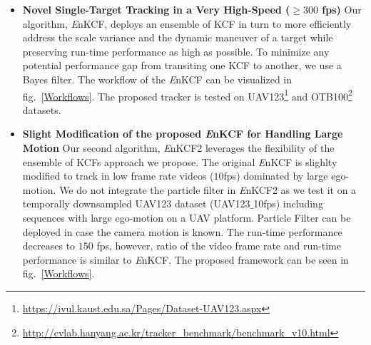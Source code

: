 \documentclass{bmvc2k}
\begin{document}
\begin{itemize}
\item \textbf{Novel Single-Target Tracking in a Very High-Speed ($\geq300$ fps) } Our
  algorithm, {\it E}nKCF, deploys an ensemble of KCF in turn to more
  efficiently address the scale variance and the dynamic maneuver of a
  target while preserving run-time performance as high as possible. To
  minimize any potential performance gap from transiting one KCF to
  another, we use a Bayes filter. The workflow of the  {\it E}nKCF can
  be visualized in fig.~\ref{Workflows}. The proposed tracker is tested on UAV123\footnote{\url{https://ivul.kaust.edu.sa/Pages/Dataset-UAV123.aspx}} and OTB100\footnote{\url{http://cvlab.hanyang.ac.kr/tracker_benchmark/benchmark_v10.html}}
  datasets. 

\item \textbf{Slight Modification of the proposed {\it E}nKCF for Handling Large Motion} Our second algorithm, 
{\it E}nKCF2 leverages the flexibility of the ensemble of KCFs approach we propose. The original {\it E}nKCF is slighlty modified to track in low frame rate videos ($10$fps) dominated by large ego-motion. We do not integrate the particle filter in {\it E}nKCF2 as we test it on a temporally downsampled UAV123 dataset (UAV123$\_$10fps) including sequences with large ego-motion on a UAV platform. Particle Filter can be deployed in case the camera motion is known. The run-time performance decreases to $150$ fps, however, ratio of the video frame rate and run-time performance is similar to {\it E}nKCF. The proposed framework can be seen in fig.~\ref{Workflows}.

\end{itemize}
\end{document}
